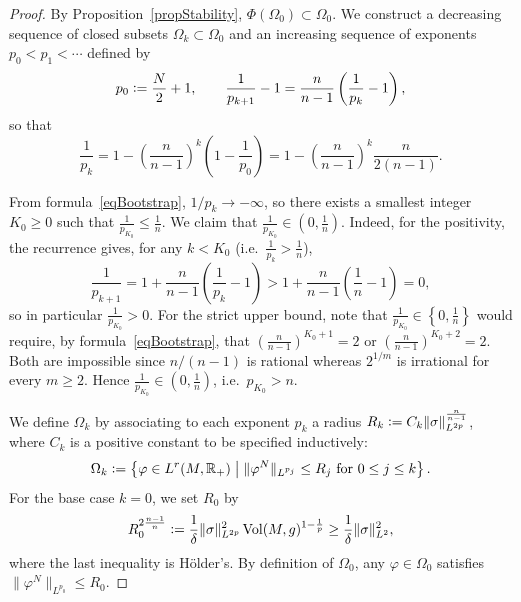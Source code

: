 \documentclass[a4paper, 10pt, reqno]{amsart}
\theoremstyle{plain}
\theoremstyle{remark}
\theoremstyle{definition}
\renewcommand{\phi}{\varphi}
\newcommand{\bR}{\mathbb{R}}
\newcommand{\definedas}{\mathrel{\raise.095ex\hbox{\rm :}\mkern-5.2mu=}}
\DeclareMathOperator{\vol}{Vol}
\begin{document}
\begin{proof}
	By Proposition~\ref{propStability}, $\Phi(\Omega_0) \subset \Omega_0$. We
	construct a decreasing sequence of closed subsets $\Omega_k \subset \Omega_0$
	and an increasing sequence of exponents $p_0 < p_1 < \cdots$ defined by
	\[
		p_0 \definedas \frac{N}{2}+1,
		\qquad
		\frac{1}{p_{k+1}} - 1 = \frac{n}{n-1} \left(\frac{1}{p_k} - 1\right),
	\]
	so that
	\begin{equation}\label{eqBootstrap}
		\frac{1}{p_k} = 1 - \left(\frac{n}{n-1}\right)^k \left(1 - \frac{1}{p_0}\right)
		= 1 - \left(\frac{n}{n-1}\right)^k \frac{n}{2(n-1)}.
	\end{equation}

	From formula~\eqref{eqBootstrap}, $1/p_k \to -\infty$, so there exists a
	smallest integer $K_0 \geq 0$ such that $\frac{1}{p_{K_0}} \leq \frac{1}{n}$.
	We claim that $\frac{1}{p_{K_0}} \in \left(0, \frac{1}{n}\right)$. Indeed, for
	the positivity, the recurrence gives, for any $k < K_0$ (i.e.\
	$\frac{1}{p_k} > \frac{1}{n}$),
	\[
		\frac{1}{p_{k+1}} = 1 + \frac{n}{n-1}\left(\frac{1}{p_k} - 1\right)
		> 1 + \frac{n}{n-1}\left(\frac{1}{n} - 1\right) = 0,
	\]
	so in particular $\frac{1}{p_{K_0}} > 0$. For the strict upper bound, note that
	$\frac{1}{p_{K_0}} \in \left\{0, \frac{1}{n}\right\}$ would require, by
	formula~\eqref{eqBootstrap}, that $\left(\frac{n}{n-1}\right)^{K_0+1} = 2$ or
	$\left(\frac{n}{n-1}\right)^{K_0+2} = 2$. Both are impossible since
	$n/(n-1)$ is rational whereas $2^{1/m}$ is irrational for every $m \geq 2$.
	Hence $\frac{1}{p_{K_0}} \in \left(0, \frac{1}{n}\right)$, i.e.\ $p_{K_0} > n$.

	We define $\Omega_k$ by associating to each exponent $p_k$ a radius $R_k
		\definedas C_k \|\sigma\|_{L^{2p}}^{\frac{n}{n-1}}$, where $C_k$ is a positive
	constant to be specified inductively:
	\[
		\Omega_k \definedas \left\{\phi \in L^r(M, \bR_+) \;\middle|\;
		\|\phi^N\|_{L^{p_j}} \leq R_j\ \text{for}\ 0 \leq j \leq k\right\}.
	\]
	For the base case $k = 0$, we set $R_0$ by
	\[
		R_0^{2\frac{n-1}{n}} \definedas \frac{1}{\delta} \|\sigma\|_{L^{2p}}^2 \vol(M, g)^{1-\frac{1}{p}}
		\geq \frac{1}{\delta} \|\sigma\|_{L^2}^2,
	\]
	where the last inequality is H\"older's. By definition of $\Omega_0$, any $\phi
		\in \Omega_0$ satisfies $\|\phi^N\|_{L^{p_0}} \leq R_0$.


\end{proof}
\end{document}
